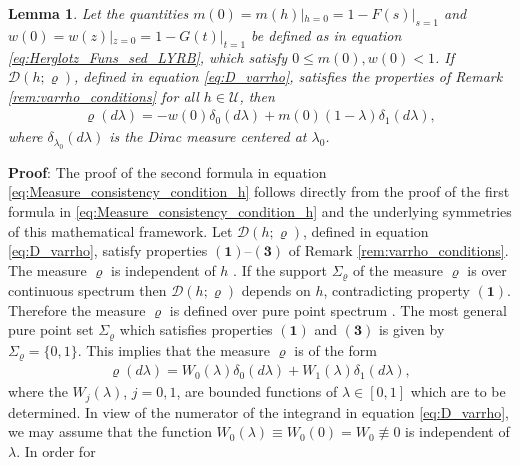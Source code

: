 \documentclass[english,12pt,jmp,graphicx]{revtex4-1}
\newtheorem{lemma}{Lemma}[section]
\begin{document}
%
%
\begin{lemma}\label{lem:Measure_consistency_condition}
  Let the quantities $m(0)=m(h)|_{h=0}=1-F(s)|_{s=1}$ and
  $w(0)=w(z)|_{z=0}=1-G(t)|_{t=1}$ be defined as in equation
  \eqref{eq:Herglotz_Funs_sed_LYRB}, which satisfy $0\leq m(0),w(0)<1$. If
  $\mathcal{D}(h;\varrho)$, defined in equation \eqref{eq:D_varrho},
  satisfies the properties of Remark \ref{rem:varrho_conditions} for
  all $h\in\mathcal{U}$, then     
\begin{align}\label{eq:Measure_consistency_condition_h}
 \varrho(d\lambda)=-w(0)\delta_0(d\lambda)+m(0)(1-\lambda)\delta_1(d\lambda),
\end{align}
%
where $\delta_{\lambda_0}(d\lambda)$ is the Dirac measure centered at $\lambda_0$. 
%
\end{lemma}
%
\noindent \textbf{Proof}:
%
The proof of the second formula in equation
\eqref{eq:Measure_consistency_condition_h} follows directly from the
proof of the first formula in \eqref{eq:Measure_consistency_condition_h}
and the underlying symmetries of this mathematical framework. Let
$\mathcal{D}(h;\varrho)$, defined in equation \eqref{eq:D_varrho}, satisfy
properties $\mathbf{(1)}$--$\mathbf{(3)}$ of Remark
\ref{rem:varrho_conditions}. The measure $\varrho$ is independent of $h$
\cite{Golden:CMP-473}. If the support $\Sigma_\varrho$ of the measure $\varrho$ is over
continuous spectrum \cite{Reed-1980} then $\mathcal{D}(h;\varrho)$ depends
on $h$, contradicting property $\mathbf{(1)}$. Therefore the measure
$\varrho$ is defined over pure point spectrum
\cite{Reed-1980}. The most general pure point set $\Sigma_\varrho$ which
satisfies properties $\mathbf{(1)}$ and $\mathbf{(3)}$ is given by
$\Sigma_\varrho=\{0,1\}$. This implies that the measure $\varrho$ is of the form  
% 
\begin{align*}
  \varrho(d\lambda)=W_0(\lambda)\delta_0(d\lambda)+W_1(\lambda)\delta_1(d\lambda),
\end{align*}
%
where the $W_j(\lambda)$, $j=0,1$, are bounded functions of $\lambda\in[0,1]$ which are to
be determined. In view of the numerator of the integrand in equation
\eqref{eq:D_varrho}, we may assume that the function
$W_0(\lambda)\equiv W_0(0)=W_0\not\equiv0$ is independent of $\lambda$. In order for
\end{document}
